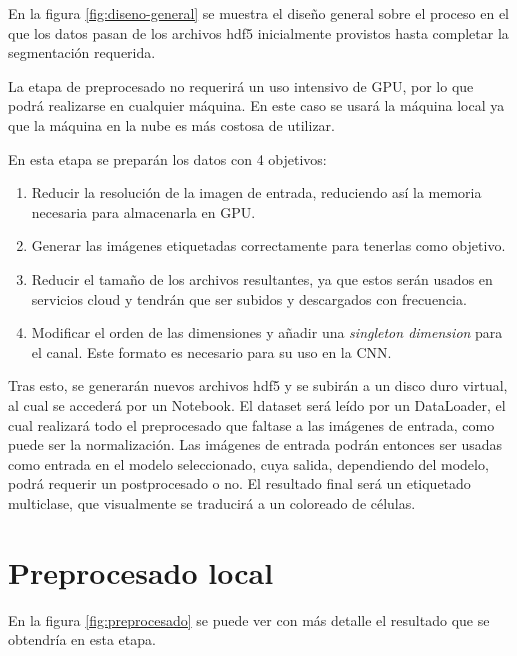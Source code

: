 \pagebreak {}

En la figura \ref{fig:diseno-general} se muestra el diseño general sobre el proceso en el que los datos pasan de los archivos hdf5 inicialmente provistos hasta completar la segmentación requerida.

La etapa de preprocesado no requerirá un uso intensivo de GPU, por lo que podrá realizarse en cualquier máquina. En este caso se usará la máquina local ya que la máquina en la nube es más costosa de utilizar.

En esta etapa se preparán los datos con 4 objetivos:
\begin{enumerate}
\item Reducir la resolución de la imagen de entrada, reduciendo así la memoria necesaria para almacenarla en GPU.
\item Generar las imágenes etiquetadas correctamente para tenerlas como objetivo.
\item Reducir el tamaño de los archivos resultantes, ya que estos serán usados en servicios cloud y tendrán que ser subidos y descargados con frecuencia.
\item Modificar el orden de las dimensiones y añadir una \textit{singleton dimension} para el canal. Este formato es necesario para su uso en la CNN.
\end{enumerate}

Tras esto, se generarán nuevos archivos hdf5 y se subirán a un disco duro virtual, al cual se accederá por un Notebook. El dataset será leído por un DataLoader, el cual realizará todo el preprocesado que faltase a las imágenes de entrada, como puede ser la normalización. Las imágenes de entrada podrán entonces ser usadas como entrada en el modelo  seleccionado, cuya salida, dependiendo del modelo, podrá requerir un postprocesado o no. El resultado final será un etiquetado multiclase, que visualmente se traducirá a un coloreado de células.

\pagebreak\section{Preprocesado local}\label{sec:preprocesado-local}


En la figura \ref{fig:preprocesado} se puede ver con más detalle el resultado que se obtendría en esta etapa.

